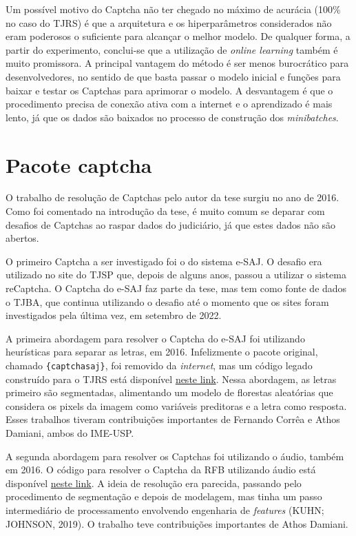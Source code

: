 \documentclass[12pt,twoside,brazilian]{book}
\begin{document}
Um possível motivo do Captcha não ter chegado no máximo de acurácia
(100\% no caso do TJRS) é que a arquitetura e os hiperparâmetros
considerados não eram poderosos o suficiente para alcançar o melhor
modelo. De qualquer forma, a partir do experimento, conclui-se que a
utilização de \emph{online learning} também é muito promissora. A
principal vantagem do método é ser menos burocrático para
desenvolvedores, no sentido de que basta passar o modelo inicial e
funções para baixar e testar os Captchas para aprimorar o modelo. A
desvantagem é que o procedimento precisa de conexão ativa com a internet
e o aprendizado é mais lento, já que os dados são baixados no processo
de construção dos \emph{minibatches}.

\hypertarget{sec-pacote-captcha}{%
\section{Pacote captcha}\label{sec-pacote-captcha}}

O trabalho de resolução de Captchas pelo autor da tese surgiu no ano de
2016. Como foi comentado na introdução da tese, é muito comum se deparar
com desafios de Captchas ao raspar dados do judiciário, já que estes
dados não são abertos.

O primeiro Captcha a ser investigado foi o do sistema e-SAJ. O desafio
era utilizado no site do TJSP que, depois de alguns anos, passou a
utilizar o sistema reCaptcha. O Captcha do e-SAJ faz parte da tese, mas
tem como fonte de dados o TJBA, que continua utilizando o desafio até o
momento que os sites foram investigados pela última vez, em setembro de
2022.

A primeira abordagem para resolver o Captcha do e-SAJ foi utilizando
heurísticas para separar as letras, em 2016. Infelizmente o pacote
original, chamado \texttt{\{captchasaj\}}, foi removido da
\emph{internet}, mas um código legado construído para o TJRS está
disponível
\href{https://github.com/decryptr/captchaTJRS/blob/master/R/tools.R}{neste
link}. Nessa abordagem, as letras primeiro são segmentadas, alimentando
um modelo de florestas aleatórias que considera os pixels da imagem como
variáveis preditoras e a letra como resposta. Esses trabalhos tiveram
contribuições importantes de Fernando Corrêa e Athos Damiani, ambos do
IME-USP.

A segunda abordagem para resolver os Captchas foi utilizando o áudio,
também em 2016. O código para resolver o Captcha da RFB utilizando áudio
está disponível
\href{https://github.com/decryptr/captchaReceitaAudio}{neste link}. A
ideia de resolução era parecida, passando pelo procedimento de
segmentação e depois de modelagem, mas tinha um passo intermediário de
processamento envolvendo engenharia de \emph{features} (KUHN; JOHNSON,
2019). O trabalho teve contribuições importantes de Athos Damiani.
\end{document}
